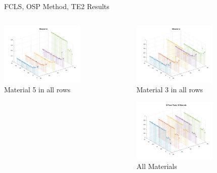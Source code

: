 \documentclass{beamer}
\begin{document}
\begin{frame}{FCLS, OSP Method, TE2 Results}
\begin{columns}
\begin{column}{0.33\textwidth}
        \includegraphics[width=4cm,center]{osp_fcls_te2_material_stem_5}
        \\ Material 5 in all rows
        \centering
    \end{column}
    \begin{column}{0.33\textwidth}
        \includegraphics[width=4cm,center]{osp_fcls_te2_material_stem_3}
        \\ Material 3 in all rows
        \centering

        \includegraphics[width=4cm,center]{osp_fcls_te2_allmaterials}
        \\ All Materials
        \centering
    \end{column}
\end{columns}
\end{frame}
\end{document}
